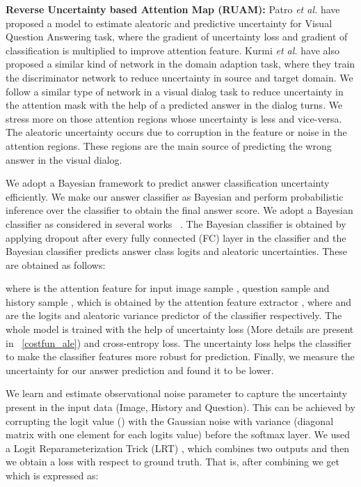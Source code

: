 \documentclass[review]{elsarticle}
\begin{document}
\textbf{Reverse Uncertainty based Attention Map (RUAM): }
Patro {\it et al.}\cite{Patro_ICCV2019} have proposed a model to estimate aleatoric and predictive uncertainty for Visual Question Answering task, where the gradient of uncertainty loss and gradient of classification is multiplied to improve attention feature. Kurmi {\it et al.} \cite{Kurmi_CVPR2019attending} have also proposed a similar kind of network in the domain adaption task, where they train the discriminator network to reduce uncertainty in source and target domain. We follow a similar type of network in a visual dialog task to reduce uncertainty in the attention mask with the help of a predicted answer in the dialog turns. We stress more on those attention regions whose uncertainty is less and vice-versa. The aleatoric uncertainty occurs due to corruption in the feature or noise in the attention regions. These regions are the main source of predicting the wrong answer in the visual dialog.

We adopt a Bayesian framework to predict answer classification uncertainty efficiently. We make our answer classifier as Bayesian and perform probabilistic inference over the classifier to obtain the final answer score. We adopt a Bayesian classifier as considered in several works ~\cite{Gal_NIPS2016,Gal_ICML2016, Fortunato_Arxiv2017,Kurmi_CVPR2019attending,Patro_ICCV2019}. The Bayesian classifier is obtained by applying dropout after every fully connected (FC) layer in the classifier and the Bayesian classifier predicts answer class logits  and aleatoric uncertainties. These are obtained as follows:

where  is the attention feature for input image sample , question sample  and history sample , which is obtained by the attention feature extractor , where  and  are the logits and aleatoric variance predictor of the classifier  respectively. 
The whole model is trained with the help of uncertainty loss (More details are present in ~\ref{costfun_ale}) and cross-entropy loss. The uncertainty loss helps the classifier to make the classifier features more robust for prediction. Finally, we measure the uncertainty for our answer prediction and found it to be lower. 

We learn and estimate observational noise parameter   to capture the uncertainty present in the input data (Image, History and Question). This can be achieved by corrupting the logit value () with the Gaussian noise with variance  (diagonal matrix with one element for each logits value) before the softmax layer. We used a Logit Reparameterization Trick (LRT) \cite{Gal2016Uncertainty}, which combines two outputs  and then we obtain a loss with respect to ground truth. That is, after combining we get  which is expressed as:
\end{document}
